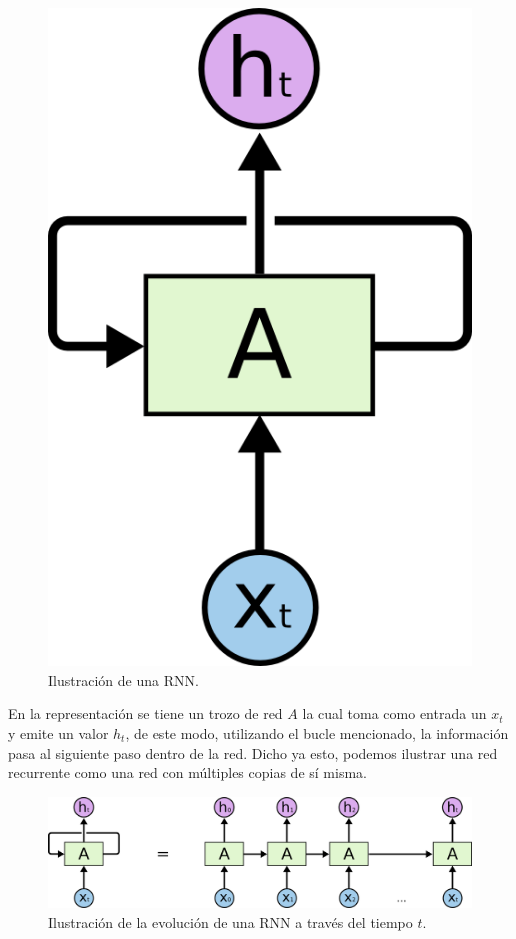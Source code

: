 \documentclass[12pt, letterpaper]{article}
\begin{document}
    \begin{figure}[H]
        \centering
        \includegraphics[width=\linewidth]{img/RNN-rolled.png}
        \caption{Ilustración de una RNN.}
    \end{figure}

    En la representación se tiene un trozo de red $A$ la cual toma como entrada un $x_t$ y emite un valor $h_t$, de este modo, utilizando el bucle mencionado, la información pasa al siguiente paso dentro de la red. Dicho ya esto, podemos ilustrar una red recurrente como una red con múltiples copias de sí misma\cite{Understanding_LSTM}.

    \begin{figure}[H]
        \centering
        \includegraphics[width=\linewidth]{img/RNN-unrolled.png}
        \caption{Ilustración de la evolución de una RNN a través del tiempo $t$.}
    \end{figure}
    
\end{document}
